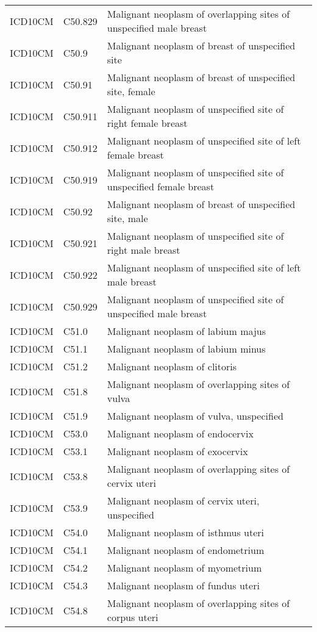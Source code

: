 \begin{table}[ht]
\begin{tabular}{lll}
  ICD10CM & C50.829 & Malignant neoplasm of overlapping sites of unspecified male breast \\ 
  ICD10CM & C50.9 & Malignant neoplasm of breast of unspecified site \\ 
  ICD10CM & C50.91 & Malignant neoplasm of breast of unspecified site, female \\ 
  ICD10CM & C50.911 & Malignant neoplasm of unspecified site of right female breast \\ 
  ICD10CM & C50.912 & Malignant neoplasm of unspecified site of left female breast \\ 
  ICD10CM & C50.919 & Malignant neoplasm of unspecified site of unspecified female breast \\ 
  ICD10CM & C50.92 & Malignant neoplasm of breast of unspecified site, male \\ 
  ICD10CM & C50.921 & Malignant neoplasm of unspecified site of right male breast \\ 
  ICD10CM & C50.922 & Malignant neoplasm of unspecified site of left male breast \\ 
  ICD10CM & C50.929 & Malignant neoplasm of unspecified site of unspecified male breast \\ 
  ICD10CM & C51.0 & Malignant neoplasm of labium majus \\ 
  ICD10CM & C51.1 & Malignant neoplasm of labium minus \\ 
  ICD10CM & C51.2 & Malignant neoplasm of clitoris \\ 
  ICD10CM & C51.8 & Malignant neoplasm of overlapping sites of vulva \\ 
  ICD10CM & C51.9 & Malignant neoplasm of vulva, unspecified \\ 
  ICD10CM & C53.0 & Malignant neoplasm of endocervix \\ 
  ICD10CM & C53.1 & Malignant neoplasm of exocervix \\ 
  ICD10CM & C53.8 & Malignant neoplasm of overlapping sites of cervix uteri \\ 
  ICD10CM & C53.9 & Malignant neoplasm of cervix uteri, unspecified \\ 
  ICD10CM & C54.0 & Malignant neoplasm of isthmus uteri \\ 
  ICD10CM & C54.1 & Malignant neoplasm of endometrium \\ 
  ICD10CM & C54.2 & Malignant neoplasm of myometrium \\ 
  ICD10CM & C54.3 & Malignant neoplasm of fundus uteri \\ 
  ICD10CM & C54.8 & Malignant neoplasm of overlapping sites of corpus uteri \\ 

\end{tabular}
\end{table}
